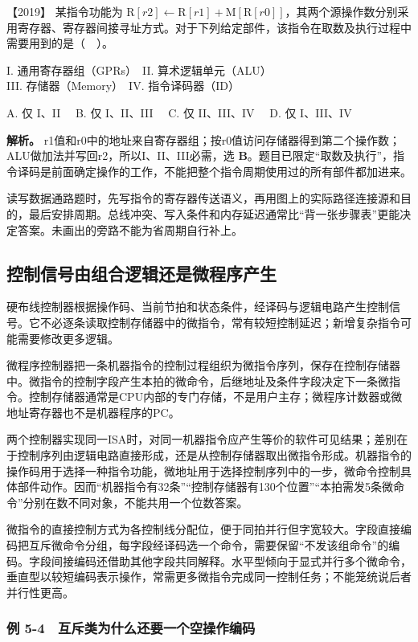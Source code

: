 \noindent{}【2019】 某指令功能为 \(\mathrm R[r2]\leftarrow\mathrm R[r1]+\mathrm M[\mathrm R[r0]]\)，其两个源操作数分别采用寄存器、寄存器间接寻址方式。对于下列给定部件，该指令在取数及执行过程中需要用到的是（　）。

I. 通用寄存器组（GPRs）　II. 算术逻辑单元（ALU）\\
III. 存储器（Memory）　IV. 指令译码器（ID）

A. 仅 I、II　 B. 仅 I、II、III　 C. 仅 II、III、IV　 D. 仅 I、III、IV


\textbf{解析。} r1值和r0中的地址来自寄存器组；按r0值访问存储器得到第二个操作数；ALU做加法并写回r2，所以I、II、III必需，选 \textbf{B}。题目已限定``取数及执行''，指令译码是前面确定操作的工作，不能把整个指令周期使用过的所有部件都加进来。

读写数据通路题时，先写指令的寄存器传送语义，再用图上的实际路径连接源和目的，最后安排周期。总线冲突、写入条件和内存延迟通常比``背一张步骤表''更能决定答案。未画出的旁路不能为省周期自行补上。

\subsection{控制信号由组合逻辑还是微程序产生}\label{co-05-04}

硬布线控制器根据操作码、当前节拍和状态条件，经译码与逻辑电路产生控制信号。它不必逐条读取控制存储器中的微指令，常有较短控制延迟；新增复杂指令可能需要修改更多逻辑。

微程序控制器把一条机器指令的控制过程组织为微指令序列，保存在控制存储器中。微指令的控制字段产生本拍的微命令，后继地址及条件字段决定下一条微指令。控制存储器通常是CPU内部的专门存储，不是用户主存；微程序计数器或微地址寄存器也不是机器程序的PC。

两个控制器实现同一ISA时，对同一机器指令应产生等价的软件可见结果；差别在于控制序列由逻辑电路直接形成，还是从控制存储器取出微指令形成。机器指令的操作码用于选择一种指令功能，微地址用于选择控制序列中的一步，微命令控制具体部件动作。因而``机器指令有32条''``控制存储器有130个位置''``本拍需发5条微命令''分别在数不同对象，不能共用一个位数答案。

微指令的直接控制方式为各控制线分配位，便于同拍并行但字宽较大。字段直接编码把互斥微命令分组，每字段经译码选一个命令，需要保留``不发该组命令''的编码。字段间接编码还借助其他字段共同解释。水平型倾向于显式并行多个微命令，垂直型以较短编码表示操作，常需更多微指令完成同一控制任务；不能笼统说后者并行性更高。

\subsubsection{例 5-4　互斥类为什么还要一个空操作编码}\label{co-ex5-4}

